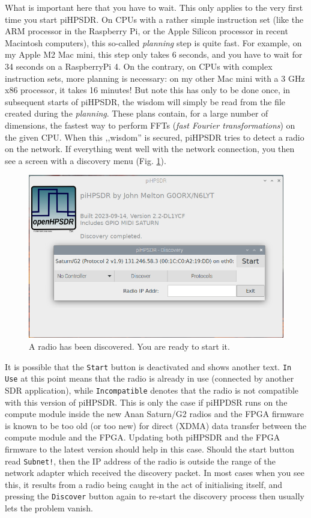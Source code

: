 \documentclass[12pt]{book}
\def\rett#1{\texttt{\color{red}#1}}
\def\pH{pi\-HPSDR\xspace}
\begin{document}
What is important here that you have to wait. This only applies to the very first time you start \pH.
On CPUs with a rather simple instruction set (like the ARM processor in the Raspberry Pi, or the Apple
Silicon processor in recent Macintosh computers), this so-called  \textit{planning} step is quite fast. For
example, on my
Apple M2 Mac mini, this step only takes 6 seconds, and you have to wait for 34 seconds on a RaspberryPi 4.
On the contrary, on CPUs with
complex instruction sets, more planning is necessary: on my other Mac mini with a 3 GHz x86 processor, it
takes 16 minutes! But note
this has only to be done once, in subsequent starts of \pH, the wisdom will simply be read from
the file created during the \textit{planning}. These plans contain, for a large number of dimensions,
the fastest way to perform FFTs (\textit{fast Fourier transformations}) on the given CPU.
When this ,,wisdom'' is secured, \pH tries to detect a radio on the network. If everything went well with
the network connection, you then see a screen with a discovery menu (Fig. \ref{fig:Start}).

\begin{figure}
\center
\includegraphics[width=12cm]{Start.png}
\caption{A radio has been discovered. You are ready  to start it.}
\label{fig:Start}
\end{figure}

It is possible that the \rett{Start} button is deactivated and shows another text. \rett{In Use} at
this point means that the radio is already in use (connected by another SDR application), while
\rett{Incompatible} denotes that the radio is not compatible with this version of \pH. This
is only the case if piHPDSR runs on the compute module inside the new Anan Saturn/G2
radios and the FPGA firmware is known to be too old (or too new)
for direct (XDMA) data transfer between the compute
module and the FPGA. Updating both \pH and the FPGA firmware to the latest version
should help in this case. Should the start button read \rett{Subnet!}, then the IP address of the
radio is outside the range of the network adapter which received the discovery packet.
In most cases when you see this, it results from a radio being caught in the act of initialising
itself, and pressing the \rett{Discover} button again to re-start the discovery process then
usually lets the problem vanish.
\end{document}
